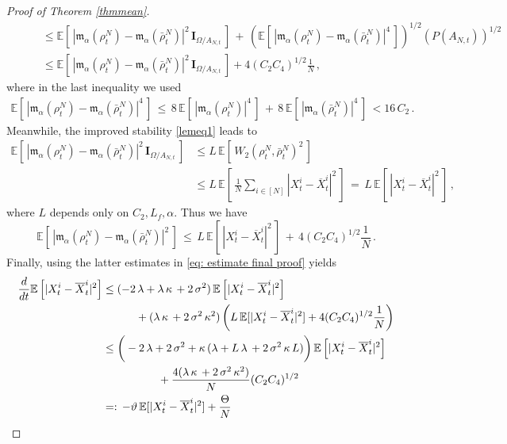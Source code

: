 \documentclass[12pt]{amsart}
\newcommand{\rd}{{\rm d} }
\newcommand{\EE}{{\mathbb E}}
\newcommand{\mm}{{\mathfrak{m}}}
\newcommand{\OX}{{\overline{X}}}
\numberwithin{equation}{section}
\begin{document}
\begin{proof}[Proof of Theorem \ref{thmmean}]
\begin{align*}
    &\quad \quad \leq \EE[\,|\mm_\alpha(\rho_t^{N})-\mm_\alpha(\bar \rho_t^N)|^2\,\textbf{I}_{\Omega /A_{N,t}}\,]\,+\,(\EE[\,|\mm_\alpha(\rho_t^{N})-\mm_\alpha(\bar \rho_t^N)|^4\,])^{1/2}(P(A_{N,t}))^{1/2} \\
    &\quad \quad \leq \EE[\,|\mm_\alpha(\rho_t^{N})-\mm_\alpha(\bar \rho_t^N)|^2\,\textbf{I}_{\Omega /A_{N,t}}\,]+4(C_2C_4)^{1/2}\frac{1}{N}\,,
\end{align*}
where in the last inequality we used
\begin{align*}
    \EE[\,|\mm_\alpha(\rho_t^{N})-\mm_\alpha(\bar \rho_t^N)|^4\,]\,\leq\, 8\,\EE[\,|\mm_\alpha(\rho_t^{N})|^4\,]\,+\,8\,\EE[\,|\mm_\alpha(\bar \rho_t^{N})|^4\,]\,<16\,C_2\,.
\end{align*}
Meanwhile, the improved stability \eqref{lemeq1} leads to
\begin{align*}
    \EE[\,|\mm_\alpha(\rho_t^{N})-\mm_\alpha(\bar \rho_t^N)|^2\,\textbf{I}_{\Omega /A_{N,t}}\,]
    & \leq L\,\EE[\,W_2(\rho_t^N,\bar\rho_t^N)^2\,]\\
    & \leq L\,\EE\left[\,\frac{1}{N}\sum_{i\in[N]}|X_t^i-\OX_t^i|^2\,\right]\,=\,L\,\EE[\,|X_t^i-\OX_t^i|^2\,]\,,
\end{align*}
where $L$ depends only on $C_2,L_f,\alpha$.
Thus we have
\begin{equation*}
\EE[\,|\mm_\alpha(\rho_t^{N})-\mm_\alpha(\bar \rho_t^N)|^2\,]\,\leq\,  L\,\EE[\,|X_t^i-\OX_t^i|^2\,]\,+\,4(C_2C_4)^{1/2}\frac{1}{N}\,.
\end{equation*}
Finally, using the latter estimates in \eqref{eq: estimate final proof} yields
\begin{equation*}
\begin{aligned}
    \frac{\rd}{\rd t}\EE\left[|X^{i}_{t} - \overline{X}^{i}_{t}|^{2}\right]  & \leq (-2\,\lambda + \lambda\,\kappa\, +2\,\sigma^{2})\, \EE\left[|X^{i}_{t} - \overline{X}^{i}_{t}|^{2}\right] \\
    &\quad \quad \quad  + (\lambda\,\kappa\, + 2\,\sigma^{2}\,\kappa^{2})\left(L\,\EE[|X_t^i-\OX_t^i|^2] + 4(C_2C_4)^{1/2}\frac{1}{N}\right)\\
    & \leq \bigg(-2\,\lambda +2\,\sigma^{2} + \kappa\,(\lambda + L\,\lambda\, + 2\,\sigma^{2}\,\kappa\,L) \bigg)\, \EE\left[|X^{i}_{t} - \overline{X}^{i}_{t}|^{2}\right]\\
    & \quad \quad \quad \quad \quad +\frac{4(\lambda\,\kappa\, + 2\,\sigma^{2}\,\kappa^{2})}{N}(C_2C_4)^{1/2}\\
    & =:\, -\vartheta\, \EE[|X_t^i-\OX_t^i|^2] + \frac{\Theta}{N}
\end{aligned}

\end{equation*}
\end{proof}
\end{document}

